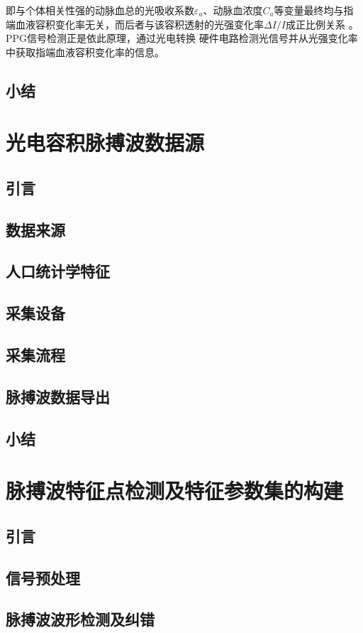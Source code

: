 即与个体相关性强的动脉血总的光吸收系数$\varepsilon _{a}$、动脉血浓度$C_{a}$等变量最终均与指端血液容积变化率无关，而后者与该容积透射的光强变化率$\Delta I/I$成正比例关系
\cite{1980Spectrophotometric,4122392,PPGYY}。PPG信号检测正是依此原理，通过光电转换
硬件电路检测光信号并从光强变化率中获取指端血液容积变化率的信息。
\section{小结}

\chapter{光电容积脉搏波数据源}
\section{引言}
\section{数据来源}
\section{人口统计学特征}
\section{采集设备}
\section{采集流程}
\section{脉搏波数据导出}
\section{小结}


\chapter{脉搏波特征点检测及特征参数集的构建}
\section{引言}
\section{信号预处理}
\section{脉搏波波形检测及纠错}

